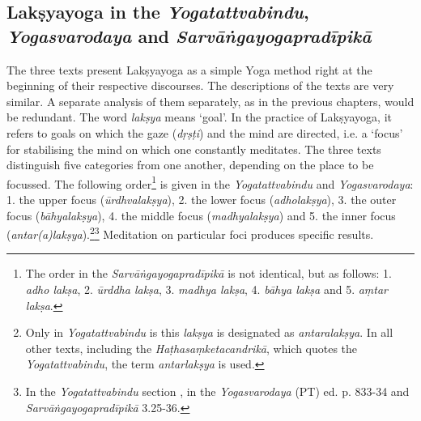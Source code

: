 \subsection{Lakṣyayoga in the \textit{Yogatattvabindu}, \textit{Yogasvarodaya} and \textit{Sarvāṅgayogapradīpikā}}

The three texts present Lakṣyayoga as a simple Yoga method right at the beginning of their respective discourses. The descriptions of the texts are very similar. A separate analysis of them separately, as in the previous chapters, would be redundant. The word \textit{lakṣya} means ‘goal’. In the practice of Lakṣyayoga, it refers to goals on which the gaze (\textit{dṛṣṭi}) and the mind are directed, i.e. a ‘focus’ for stabilising the mind on which one constantly meditates. The three texts distinguish five categories from one another, depending on the place to be focussed. The following order\footnote{The order in the \textit{Sarvāṅgayogapradīpikā} is not identical, but as follows: 1. \textit{adho lakṣa}, 2. \textit{ūrddha lakṣa}, 3. \textit{madhya lakṣa}, 4. \textit{bāhya lakṣa} and 5. \textit{aṃtar lakṣa}.} is given in the \textit{Yogatattvabindu} and \textit{Yogasvarodaya}: 1. the upper focus (\textit{ūrdhvalakṣya}), 2. the lower focus (\textit{adholakṣya}), 3. the outer focus (\textit{bāhyalakṣya}), 4. the middle focus (\textit{madhyalakṣya}) and 5. the inner focus (\textit{antar(a)lakṣya}).\footnote{Only in \textit{Yogatattvabindu} is this \textit{lakṣya} is designated as \textit{antaralakṣya}. In all other texts, including the \textit{Haṭhasaṃketacandrikā}, which quotes the \textit{Yogatattvabindu}, the term \textit{antarlakṣya} is used.}\footnote{In the \textit{Yogatattvabindu} section , in the \textit{Yogasvarodaya} (PT) ed. p. 833-34 and \textit{Sarvāṅgayogapradīpikā} 3.25-36.} Meditation on particular foci produces specific results.

